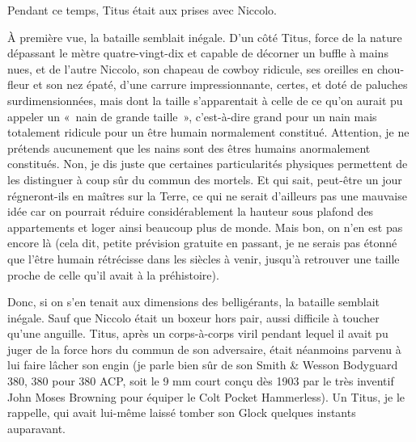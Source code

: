 Pendant ce temps, Titus était aux prises avec Niccolo.

À première vue, la bataille semblait inégale. D’un côté Titus, force de la nature dépassant le mètre quatre-vingt-dix et capable de décorner un buffle à mains nues, et de l’autre Niccolo, son chapeau de cowboy ridicule, ses oreilles en chou-fleur et son nez épaté, d’une carrure impressionnante, certes, et doté de paluches surdimensionnées, mais dont la taille s’apparentait à celle de ce qu’on aurait pu appeler un «~nain de grande taille~», c’est-à-dire grand pour un nain mais totalement ridicule pour un être humain normalement constitué. Attention, je ne prétends aucunement que les nains sont des êtres humains anormalement constitués. Non, je dis juste que certaines particularités physiques permettent de les distinguer à coup sûr du commun des mortels. Et qui sait, peut-être un jour régneront-ils en maîtres sur la Terre, ce qui ne serait d’ailleurs pas une mauvaise idée car on pourrait réduire considérablement la hauteur sous plafond des appartements et loger ainsi beaucoup plus de monde. Mais bon, on n’en est pas encore là (cela dit, petite prévision gratuite en passant, je ne serais pas étonné que l’être humain rétrécisse dans les siècles à venir, jusqu’à retrouver une taille proche de celle qu’il avait à la préhistoire).

\illusloflabel{}%
Donc, si on s’en tenait aux dimensions des belligérants, la bataille semblait inégale. Sauf que Niccolo était un boxeur hors pair, aussi difficile à toucher qu’une anguille. Titus, après un corps-à-corps viril pendant lequel il avait pu juger de la force hors du commun de son adversaire, était néanmoins parvenu à lui faire lâcher son engin (je parle bien sûr de son Smith \& Wesson Bodyguard 380, 380 pour 380 ACP, soit le 9 mm court conçu dès 1903 par le très inventif John Moses Browning pour équiper le Colt Pocket Hammerless). Un Titus, je le rappelle, qui avait lui-même laissé tomber son Glock quelques instants auparavant. 

